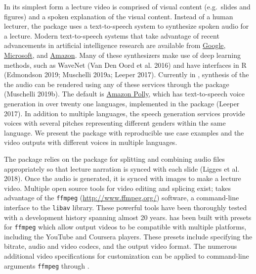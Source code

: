 In its simplest form a lecture video is comprised of visual content
(e.g.~slides and figures) and a spoken explanation of the visual
content. Instead of a human lecturer, the  package uses a
text-to-speech system to synthesize spoken audio for a lecture. Modern
text-to-speech systems that take advantage of recent advancements in
artificial intelligence research are available from
\href{https://cloud.google.com/text-to-speech/}{Google},
\href{https://azure.microsoft.com/en-us/services/cognitive-services/text-to-speech/}{Microsoft},
and \href{https://aws.amazon.com/polly/}{Amazon}. Many of these
synthesizers make use of deep learning methods, such as WaveNet (Van Den
Oord et al. 2016) and have interfaces in R (Edmondson 2019; Muschelli
2019a; Leeper 2017). Currently in , synthesis of the the audio
can be rendered using any of these services through the
 package (Muschelli 2019b). The default is
\href{https://aws.amazon.com/polly/}{Amazon Polly}, which has
text-to-speech voice generation in over twenty one languages,
implemented in the  package (Leeper 2017). In
addition to multiple languages, the speech generation services provide
voices with several pitches representing different genders within the
same language. We present the  package with reproducible use
case examples and the video outputs with different voices in multiple
languages.

The  package relies on the  package for
splitting and combining audio files appropriately so that lecture
narration is synced with each slide (Ligges et al. 2018). Once the audio
is generated, it is synced with images to make a lecture video. Multiple
open source tools for video editing and splicing exist;  takes
advantage of the \texttt{ffmpeg} (\url{http://www.ffmpeg.org/})
software, a command-line interface to the \texttt{libav} library. These
powerful tools have been thoroughly tested with a development history
spanning almost 20 years.  has been built with presets for
\texttt{ffmpeg} which allow output videos to be compatible with multiple
platforms, including the YouTube and Coursera players. These presets
include specifying the bitrate, audio and video codecs, and the output
video format. The numerous additional video specifications for
customization can be applied to command-line arguments \texttt{ffmpeg}
through .

